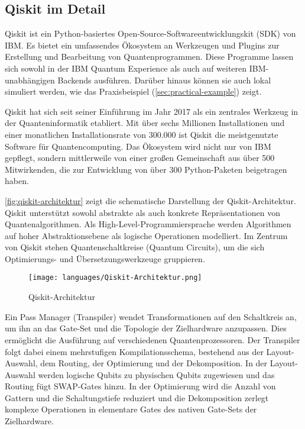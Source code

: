 \subsection{Qiskit im Detail}
\label{sec:qiskit-details}

Qiskit ist ein Python-basiertes Open-Source-Softwareentwicklungskit (SDK) von IBM. Es bietet ein umfassendes Ökosystem an Werkzeugen und Plugins zur Erstellung und Bearbeitung von Quantenprogrammen. Diese Programme lassen sich sowohl in der IBM Quantum Experience als auch auf weiteren IBM-unabhängigen Backends ausführen. \autocite{singhSurveyAvailableTools2024a} Darüber hinaus können sie auch lokal simuliert werden, wie das Praxisbeispiel (\autoref{sec:practical-example}) zeigt. 

Qiskit hat sich seit seiner Einführung im Jahr 2017 als ein zentrales Werkzeug in der Quanteninformatik etabliert. Mit über sechs Millionen Installationen und einer monatlichen Installationsrate von 300.000 ist Qiskit die meistgenutzte Software für Quantencomputing. Das Ökosystem wird nicht nur von IBM gepflegt, sondern mittlerweile von einer großen Gemeinschaft aus über 500 Mitwirkenden, die zur Entwicklung von über 300 Python-Paketen beigetragen haben. \autocite{javadi-abhariQuantumComputingQiskit2024a}

\autoref{fig:qiskit-architektur} zeigt die schematische Darstellung der Qiskit-Architektur. Qiskit unterstützt sowohl abstrakte als auch konkrete Repräsentationen von Quantenalgorithmen. Als High-Level-Programmiersprache werden Algorithmen auf hoher Abstraktionsebene als logische Operationen modelliert. Im Zentrum von Qiskit stehen Quantenschaltkreise (Quantum Circuits), um die sich Optimierungs- und Übersetzungswerkzeuge gruppieren. \autocite{javadi-abhariQuantumComputingQiskit2024a}

\begin{figure}[H]
    \centering
    \texttt{[image: languages/Qiskit-Architektur.png]}
    \caption{Qiskit-Architektur \autocite{javadi-abhariQuantumComputingQiskit2024a}}
    \label{fig:qiskit-architektur}
\end{figure}

Ein Pass Manager (Transpiler) wendet Transformationen auf den Schaltkreis an, um ihn an das Gate-Set und die Topologie der Zielhardware anzupassen. Dies ermöglicht die Ausführung auf verschiedenen Quantenprozessoren. Der Transpiler folgt dabei einem mehrstufigen Kompilationsschema, bestehend aus der Layout-Auswahl, dem Routing, der Optimierung und der Dekomposition. In der Layout-Auswahl werden logische Qubits zu physischen Qubits zugewiesen und das Routing fügt SWAP-Gates hinzu. In der Optimierung wird die Anzahl von Gattern und die Schaltungstiefe reduziert und die Dekomposition zerlegt komplexe Operationen in elementare Gates des nativen Gate-Sets der Zielhardware. \autocite{javadi-abhariQuantumComputingQiskit2024a}

